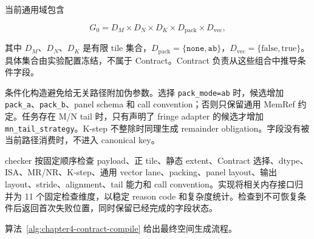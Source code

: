 当前通用域包含

\begin{equation}
G_0=
D_M\times D_N\times D_K\times
D_{\mathrm{pack}}\times D_{\mathrm{vec}},
\label{eq:chapter4-g0}
\end{equation}

其中 $D_M$、$D_N$、$D_K$ 是有限 tile 集合，$D_{\mathrm{pack}}=\{\texttt{none},\texttt{ab}\}$，$D_{\mathrm{vec}}=\{\mathrm{false},\mathrm{true}\}$。具体集合由实验配置冻结，不属于 Contract。Contract 负责从这些组合中推导条件字段。

条件化构造避免给无关路径附加伪参数。选择 \texttt{pack\_mode=ab} 时，候选增加 \texttt{pack\_a}、\texttt{pack\_b}、panel schema 和 call convention；否则只保留通用 MemRef 约定。任务存在 M/N tail 时，只有声明了 fringe adapter 的候选才增加 \texttt{mn\_tail\_strategy}。K-step 不整除时同理生成 remainder obligation。字段没有被当前路径消费时，不进入 canonical key。

checker 按固定顺序检查 payload、正 tile、静态 extent、Contract 选择、dtype、ISA、MR/NR、K-step、通用 vector lane、packing、panel layout、输出 layout、stride、alignment、tail 能力和 call convention。实现将相关内存接口归并为 11 个固定检查维度，以稳定 reason code 和复杂度统计。检查到不可恢复条件后返回首次失败位置，同时保留已经完成的字段状态。

算法~\ref{alg:chapter4-contract-compile} 给出最终空间生成流程。

